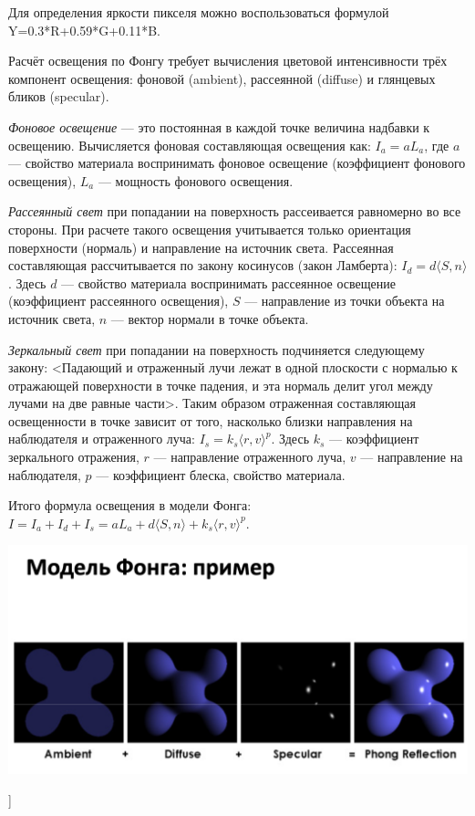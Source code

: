 Для определения яркости пикселя можно воспользоваться формулой Y=0.3*R+0.59*G+0.11*B.

Расчёт освещения по Фонгу требует вычисления цветовой интенсивности трёх компонент освещения: фоновой (ambient), рассеянной (diffuse) и глянцевых бликов (specular).

\textit{Фоновое освещение} --- это постоянная в каждой точке величина надбавки к освещению. 
Вычисляется фоновая составляющая освещения как: $I_a = a L_a$, где $a$ --- свойство материала воспринимать фоновое освещение (коэффициент фонового освещения), $L_a$ --- мощность фонового освещения.

\textit{Рассеянный свет} при попадании на поверхность рассеивается равномерно во все стороны. 
При расчете такого освещения учитывается только ориентация поверхности (нормаль) и направление на источник света. 
Рассеянная составляющая рассчитывается по закону косинусов (закон Ламберта): $I_d = d \langle S, n \rangle$. 
Здесь $d$ --- свойство материала воспринимать рассеянное освещение (коэффициент рассеянного освещения), $S$ --- направление из точки объекта на источник света, $n$ --- вектор нормали в точке объекта.

\textit{Зеркальный свет} при попадании на поверхность подчиняется следующему закону: <Падающий и отраженный лучи лежат в одной плоскости с нормалью к отражающей поверхности в точке падения, и эта нормаль делит угол между лучами на две равные части>. 
Таким образом отраженная составляющая освещенности в точке зависит от того, насколько близки направления на наблюдателя и отраженного луча: $I_s = k_s \langle r, v \rangle^p$. Здесь $k_s$ --- коэффициент зеркального отражения, $r$ --- направление отраженного луча, $v$ --- направление на наблюдателя, $p$ --- коэффициент блеска, свойство материала.

Итого формула освещения в модели Фонга: $I = I_a + I_d + I_s = a L_a + d \langle S, n \rangle + k_s \langle r, v \rangle^p$.

\includegraphics[width=\columnwidth]{pics/fong.png}

\bigbreak
[\cite[page 19-26]{iit_graphics}]